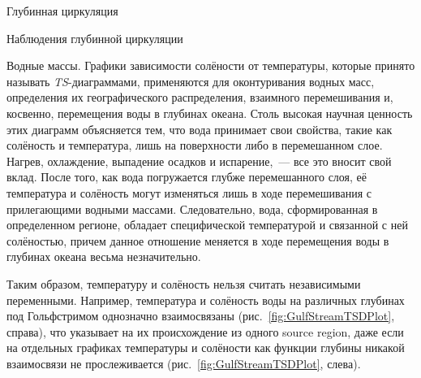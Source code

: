 \begin{chapter}{Глубинная циркуляция}
\begin{section}{Наблюдения глубинной циркуляции}
\begin{paragraph}{Водные массы.}
Графики зависимости солёности от температуры, которые принято называть
\emph{TS}-диаграммами, применяются для оконтуривания водных масс, определения
их географического распределения, взаимного 
перемешивания и, косвенно, перемещения воды
в глубинах океана. Столь высокая научная ценность этих диаграмм объясняется
тем, что вода принимает свои свойства, такие как солёность и температура,
лишь на поверхности либо в перемешанном 
слое. Нагрев, охлаждение, 
выпадение осадков и испарение,~--- все это вносит свой вклад. 
После того, как вода погружается глубже перемешанного 
слоя, её температура и солёность могут изменяться 
лишь в ходе перемешивания 
с прилегающими водными массами. Следовательно, вода, сформированная в 
определенном регионе, обладает специфической температурой и связанной с ней
солёностью, причем данное отношение меняется в ходе перемещения воды в 
глубинах океана весьма незначительно.
%

Таким образом, температуру и солёность нельзя считать независимыми переменными.
Например, температура и солёность воды на различных глубинах под 
Гольфстримом однозначно взаимосвязаны
(рис.~\ref{fig:GulfStreamTSDPlot}, справа), что указывает на их происхождение
из одного source region, даже если на отдельных графиках температуры 
и солёности как функции глубины никакой взаимосвязи не прослеживается
(рис.~\ref{fig:GulfStreamTSDPlot}, слева).
%


\end{paragraph}
\end{section}
\end{chapter}
